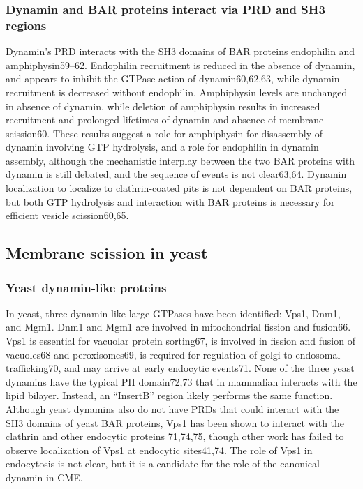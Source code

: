 		\subsubsection{Dynamin and BAR proteins interact via PRD and SH3 regions }
		Dynamin’s PRD interacts with the SH3 domains of BAR proteins endophilin and amphiphysin59–62. Endophilin recruitment is reduced in the absence of dynamin, and appears to inhibit the GTPase action of dynamin60,62,63, while dynamin recruitment is decreased without endophilin. Amphiphysin levels are unchanged in absence of dynamin, while deletion of amphiphysin results in increased recruitment and prolonged lifetimes of dynamin and absence of membrane scission60. These results suggest a role for amphiphysin for disassembly of dynamin involving GTP hydrolysis, and a role for endophilin in dynamin assembly, although the mechanistic interplay between the two BAR proteins with dynamin is still debated, and the sequence of events is not clear63,64. Dynamin localization to localize to clathrin-coated pits is not dependent on BAR proteins, but both GTP hydrolysis and interaction with BAR proteins is necessary for efficient vesicle scission60,65.



	\subsection{Membrane scission in yeast} \label {yeast_scission}
		\subsubsection{Yeast dynamin-like proteins}
		In yeast, three dynamin-like large GTPases have been identified: Vps1, Dnm1, and Mgm1. Dnm1 and Mgm1 are involved in mitochondrial fission and fusion66. Vps1 is essential for vacuolar protein sorting67, is involved in fission and fusion of vacuoles68 and peroxisomes69, is required for regulation of golgi to endosomal trafficking70, and may arrive at early endocytic events71. None of the three yeast dynamins have the typical PH domain72,73 that in mammalian interacts with the lipid bilayer. Instead, an “InsertB” region likely performs the same function. Although yeast dynamins also do not have PRDs that could interact with the SH3 domains of yeast BAR proteins, Vps1 has been shown to interact with the clathrin and other endocytic proteins 71,74,75, though other work has failed to observe localization of Vps1 at endocytic sites41,74. The role of Vps1 in endocytosis is not clear, but it is a candidate for the role of the canonical dynamin in CME.


